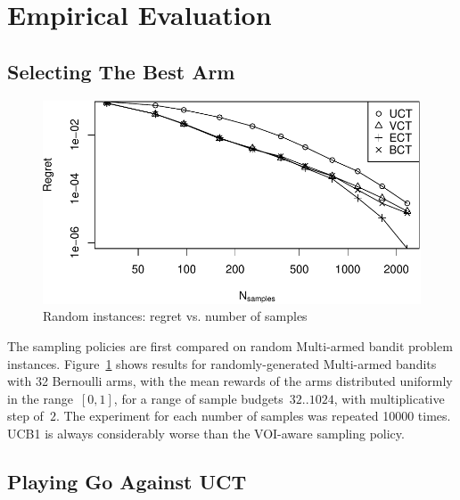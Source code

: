 \documentclass{ecai2012}
\begin{document}
\section{Empirical Evaluation}
\label{sec:empirical-evaluation}

\subsection{Selecting The Best Arm}
\label{sec:emp-arm}

\begin{figure}[h!]
\centering
\includegraphics[scale=0.5]{flat.pdf}
\vspace{-8pt}
\caption{Random instances: regret vs. number of samples}
\label{fig:random-instances}
\vspace{-16pt}
\end{figure}

The sampling policies are first compared on random Multi-armed bandit 
problem instances. Figure~\ref{fig:random-instances} shows results for
randomly-generated Multi-armed bandits with 32 Bernoulli arms, with
the mean rewards of the arms distributed uniformly in the range~$[0,
  1]$, for a range of sample budgets~$32..1024$, with multiplicative
step of~$2$. The experiment for each number of samples was repeated
10000 times. UCB1 is always considerably worse than the
VOI-aware sampling policy.

\subsection{Playing Go Against UCT}
\label{sec:emp-go}
\end{document}
